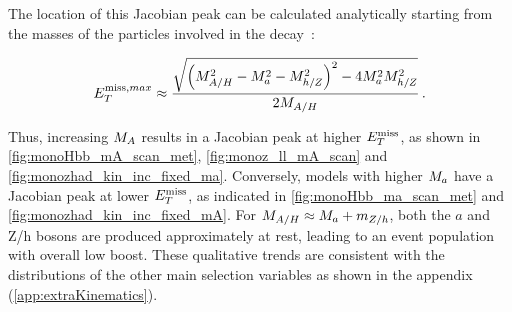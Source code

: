 The location of this Jacobian peak can be calculated analytically starting from the masses of the particles involved in the decay~\cite{Bauer:2017ota}:

\newcommand{\mAH}{\ensuremath{M_{A/H}}\xspace}
\begin{align}
E^{\mathrm{miss},max}_T \approx \frac{\sqrt{\left(\mAH^2 -\ma^2 -M_{h/Z}^2\right)^2 - 4 \ma^2 M_{h/Z}^2}}{2\mAH}\,.
\label{eq:monoH_peak_met}
\end{align}

Thus, increasing $M_{A}$ results in  a Jacobian peak at higher $E_T^\mathrm{miss}$, as shown in \autoref{fig:monoHbb_mA_scan_met}, \autoref{fig:monoz_ll_mA_scan} and \autoref{fig:monozhad_kin_inc_fixed_ma}.
Conversely, models with higher $M_{a}$ have a Jacobian peak at lower $E_T^\mathrm{miss}$, as indicated in \autoref{fig:monoHbb_ma_scan_met} and \autoref{fig:monozhad_kin_inc_fixed_mA}. 
For $\mAH\approx\ma+m_{Z/h}$, both the $a$ and Z/h bosons are produced approximately at rest, leading to an event population with overall low boost. 
These qualitative trends are consistent with the distributions of the other main selection variables as shown in the appendix (\autoref{app:extraKinematics}).





